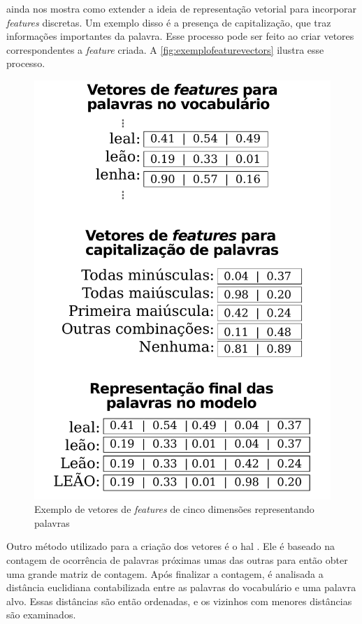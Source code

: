  ainda nos mostra como extender a ideia de representação vetorial para incorporar \textit{features} discretas. Um exemplo disso é a presença de capitalização, que traz informações importantes da palavra. Esse processo pode ser feito ao criar vetores correspondentes a \textit{feature} criada. A \autoref{fig:exemplofeaturevectors} ilustra esse processo.

\begin{figure}[htb]
  \caption{Exemplo de vetores de \textit{features} de cinco dimensões representando palavras} \label{fig:exemplofeaturevectors}
  \begin{center}
      \includegraphics[scale=0.35]{img/exemplofeaturevectors.pdf}
  \end{center}
\end{figure}

Outro método utilizado para a criação dos vetores é o \ac{hal} \cite{lund1996producing}. Ele é baseado na contagem de ocorrência de palavras próximas umas das outras para então obter uma grande matriz de contagem. Após finalizar a contagem, é analisada a distância euclidiana contabilizada entre as palavras do vocabulário e uma palavra alvo. Essas distâncias são então ordenadas, e os vizinhos com menores distâncias são examinados.

